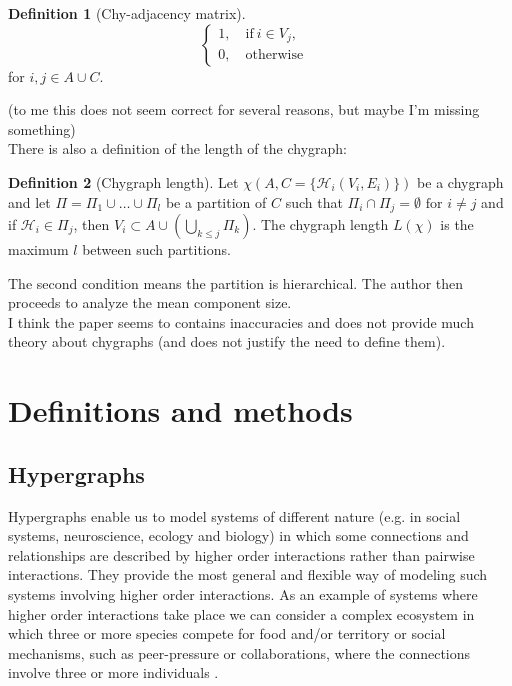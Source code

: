 \documentclass[a4paper,12pt]{article}
\theoremstyle{definition}
\newtheorem{definition}{Definition}%
\theoremstyle{remark}
\begin{document}
\begin{itemize}
\begin{definition}[Chy-adjacency matrix]
\begin{equation*}
\begin{cases}
            1, \quad \text{if} \ i \in V_j ,& \\
            0, \quad \text{otherwise}
        \end{cases}
    \end{equation*}
    for $i,j \in A \cup C$.
    \end{definition}
    (to me this does not seem correct for several reasons, but maybe I'm missing something) \\
    There is also a definition of the length of the chygraph:
    \begin{definition}[Chygraph length]
        Let $\chi(A, C=\{ \mathcal{H}_i(V_i, E_i)\})$ be a chygraph and let $\Pi = \Pi_1 \cup \dots \cup \Pi_l$ be a partition of $C$ such that $\Pi_i \cap \Pi_j = \emptyset \text{ for } i \neq j$ and if $\mathcal{H}_i \in \Pi_j$, then $V_i \subset A \cup (\bigcup_{k \leq j} \Pi_k)$. The chygraph length $L(\chi)$ is the maximum $l$ between such partitions. 
        \end{definition}
    The second condition means the partition is hierarchical. The author then proceeds to analyze the mean component size. \\ 
    I think the paper seems to contains inaccuracies and does not provide much theory about chygraphs (and does not justify the need to define them). 



\end{itemize}

\section{Definitions and methods}
\subsection{Hypergraphs}
Hypergraphs enable us to model systems of different nature (e.g. in social systems, neuroscience, ecology and biology) in which some connections and relationships are described by higher order interactions rather than pairwise interactions. They provide the most general and flexible way of modeling such systems involving higher order interactions. As an example of systems where higher order interactions take place we can consider a complex ecosystem in which three or more species compete for food and/or territory \cite{Benson2018} or social mechanisms, such as peer-pressure or collaborations, where the connections involve three or more individuals \cite{levine2017}. 
 
\end{document}
